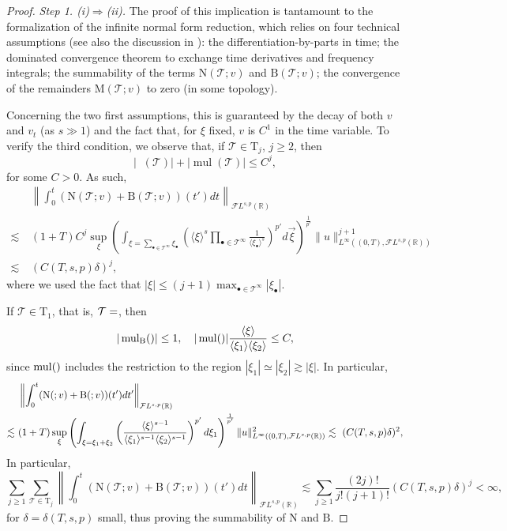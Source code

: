 \documentclass[%
11pt,  reqno]{amsart}
\makeatletter
\newcommand{\jap}[1]{\langle #1 \rangle}
\newcommand{\5}{\textup{V}}
\theoremstyle{remark}
\newcommand{\R}{\mathbb{R}}
\newcommand{\bul}{\bullet}
\newcommand{\TT}{\mathcal{T}}
\newcommand{\Tr}{\mathrm{T}}
\DeclareMathOperator{\mul}{mul}
\DeclareMathOperator{\mulB}{mul_{\BB}}
\def\<#1>{\csname MH@symb@#1\endcsname}
\numberwithin{equation}{section}
\numberwithin{theorem}{section}
\newcommand{\MM}{\mathrm{M}}
\newcommand{\NN}{\mathrm{N}}
\newcommand{\BB}{\mathrm{B}}
\makeatother
\begin{document}
\begin{proof}
    \textit{Step 1. \rm(i)$\Rightarrow$\rm(ii).} The proof of this implication is tantamount to the formalization of the infinite normal form reduction, which relies on four technical assumptions (see also the discussion in \cite[Section 4]{KOY20}): the differentiation-by-parts in time; the dominated convergence theorem to exchange time derivatives and frequency integrals; the summability of the terms $\NN(\TT;v)$ and $\BB(\TT;v)$; the convergence of the remainders $\MM(\TT;v)$ to zero (in some topology).
	
	Concerning the two first assumptions, this is guaranteed by the decay of both $v$ and $v_t$ (as $s\gg 1$) and the fact that, for $\xi$ fixed, $v$ is $C^1$ in the time variable.
	To verify the third condition, we observe that, if $\TT\in \Tr_{j}$, $j\ge 2$, then
    \begin{equation}\label{eq:estimativa_mul}
        |\mulB(\TT)| + |\mul(\TT)|\le C^j,
    \end{equation}
    for some $C>0$.  As such, 
	\begin{align*}
	&\left\|\int_0^t(\NN(\TT;v)+\BB(\TT;v))(t')dt\right\|_{\mathcal{F}L^{s,p}(\R)}\\\lesssim\ & (1+T)C^j\sup_\xi \left( \int_{\xi=\sum_{\bul\in\TT^\infty}\xi_\bul} \left(\jap{\xi}^{s}\prod_{{\bul\in \TT^\infty}} \frac{1}{\jap{\xi_\bul}^{s}}\right)^{p'} d\vec{\xi} \right)^{\frac{1}{p'}}\|u\|_{L
    ^\infty((0,T),\mathcal{F}L^{s,p}(\R))}^{j+1}\\\lesssim\ & (C(T,s,p)\delta)^j,
	\end{align*}
    where we used the fact that $|\xi|\le (j+1)\max_{\bul\in\TT^\infty}|\xi_\bul|$.
    
    If $\TT\in \Tr_1$, that is, $\TT=\<1>$, then
        \begin{equation}\label{eq:estimativa_mul2}
        |\mulB(\<1>)|\le 1,\quad |\mul(\<1>)|\frac{\jap{\xi}}{\jap{\xi_1}\jap{\xi_2}}\le C,
    \end{equation}
since $\mul(\<1>)$ includes the restriction to the region $|\xi_1|\simeq |\xi_2|\gtrsim |\xi|$. In particular,
\begin{align*}
	&\left\|\int_0^t(\NN(\<1>;v) + \BB(\<1>;v))(t')dt'\right\|_{\mathcal{F}L^{s,p}(\R)}\\\lesssim\ & (1+T)\sup_\xi \left( \int_{\xi=\xi_1+\xi_2} \left(\frac{\jap{\xi}^{s-1}}{\jap{\xi_1}^{s-1}\jap{\xi_2}^{s-1}}\right)^{p'} d\xi_1 \right)^{\frac{1}{p'}}\|u\|_{L
    ^\infty((0,T),\mathcal{F}L^{s,p}(\R))}^{2}\lesssim\  (C(T,s,p)\delta)^2,
	\end{align*}
In particular,
\begin{equation}
    \sum_{j\ge 1}\sum_{\TT\in\Tr_j}\left\|\int_0^t(\NN(\TT;v)+\BB(\TT;v))(t')dt\right\|_{\mathcal{F}L^{s,p}(\R)} \lesssim \sum_{j\ge 1}\frac{(2j)!}{j!(j+1)!}(C(T,s,p)\delta)^j <\infty,
\end{equation}
for $\delta=\delta(T,s,p)$ small, thus proving the summability of $\NN$ and $\BB$. 


\end{proof}
\end{document}
